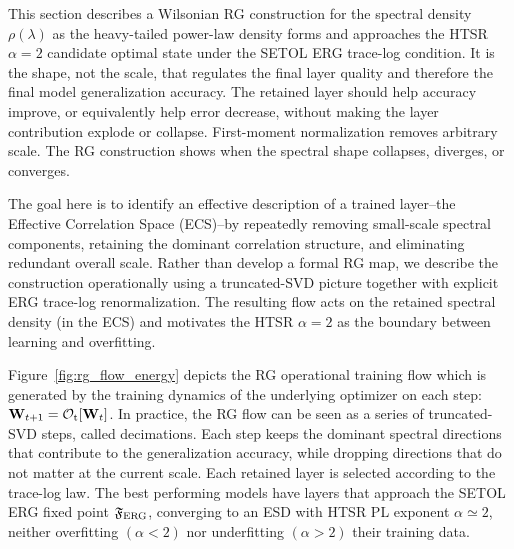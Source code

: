 \documentclass[10pt,twocolumn]{article}
\newcommand{\Ferg}{\mathfrak F_{\rm ERG}}
\newcommand{\Opt}{\mathcal O_{\rm t}}
\newcommand{\takeaway}[1]{%
  \par\vspace{4pt}\noindent\textcolor{boxblue}{#1}%
}
\newcommand{\eqtight}[1]{\[\vspace{-1pt}#1\vspace{-3pt}\]}
\begin{document}

This section describes a Wilsonian RG construction for the
spectral density $\rho({\lambda})$ as the heavy-tailed power-law density forms
and approaches the HTSR $\alpha=2$ candidate optimal state under the SETOL ERG trace-log condition.
It is the shape, not the scale, that regulates the final layer quality and therefore the final model generalization accuracy.
The retained layer should help accuracy improve, or equivalently help error decrease,
without making the layer contribution explode or collapse. 
First-moment normalization removes arbitrary scale.
The RG construction shows when the spectral shape collapses, diverges, or converges.

The goal here  is to identify an effective description of a trained
layer--the Effective Correlation Space (ECS)--by repeatedly removing
small-scale spectral components, retaining the dominant
correlation structure, and eliminating redundant overall scale.
Rather than develop a formal RG map, we describe the
construction operationally using a truncated-SVD picture
together with explicit ERG trace-log renormalization. The resulting
flow acts on the retained spectral density (in the ECS)
and motivates the HTSR $\alpha=2$ as the boundary between
learning and overfitting.

Figure~\ref{fig:rg_flow_energy} depicts the RG operational training flow which is generated by the training dynamics
of the underlying optimizer on each step: 
$\mathbf{W}_{t+1}=\Opt[\mathbf{W}_t]$.
In practice, the RG flow can be seen as a series of truncated-SVD steps, called decimations.
Each step keeps the dominant spectral directions that contribute to the generalization accuracy,
while dropping directions that do not matter at the current scale.
Each retained layer is selected according to the trace-log law.
The best performing models have layers that approach the SETOL ERG fixed point $\Ferg$,
converging to an ESD with HTSR PL exponent $\alpha\simeq 2$, neither overfitting $(\alpha<2)$
nor underfitting $(\alpha>2)$ their training data.
\end{document}
